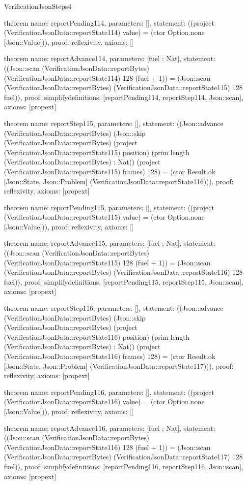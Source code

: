 \begin{lexlean}{VerificationJsonSteps4}
\begin{semanticmodule}
theorem{
  name: reportPending114,
  parameters: [],
  statement: ((project (VerificationJsonData::reportState114) value) = (ctor Option.none [Json::Value])),
  proof: reflexivity{},
  axioms: []
}

theorem{
  name: reportAdvance114,
  parameters: [fuel : Nat],
  statement: ((Json::scan (VerificationJsonData::reportBytes) (VerificationJsonData::reportState114) 128 (fuel + 1)) = (Json::scan (VerificationJsonData::reportBytes) (VerificationJsonData::reportState115) 128 fuel)),
  proof: simplify{definitions: [reportPending114, reportStep114, Json::scan]},
  axioms: [propext]
}

theorem{
  name: reportStep115,
  parameters: [],
  statement: ((Json::advance (VerificationJsonData::reportBytes) (Json::skip (VerificationJsonData::reportBytes) (project (VerificationJsonData::reportState115) position) (prim length (VerificationJsonData::reportBytes) : Nat)) (project (VerificationJsonData::reportState115) frames) 128) = (ctor Result.ok [Json::State, Json::Problem] (VerificationJsonData::reportState116))),
  proof: reflexivity{},
  axioms: [propext]
}

theorem{
  name: reportPending115,
  parameters: [],
  statement: ((project (VerificationJsonData::reportState115) value) = (ctor Option.none [Json::Value])),
  proof: reflexivity{},
  axioms: []
}

theorem{
  name: reportAdvance115,
  parameters: [fuel : Nat],
  statement: ((Json::scan (VerificationJsonData::reportBytes) (VerificationJsonData::reportState115) 128 (fuel + 1)) = (Json::scan (VerificationJsonData::reportBytes) (VerificationJsonData::reportState116) 128 fuel)),
  proof: simplify{definitions: [reportPending115, reportStep115, Json::scan]},
  axioms: [propext]
}

theorem{
  name: reportStep116,
  parameters: [],
  statement: ((Json::advance (VerificationJsonData::reportBytes) (Json::skip (VerificationJsonData::reportBytes) (project (VerificationJsonData::reportState116) position) (prim length (VerificationJsonData::reportBytes) : Nat)) (project (VerificationJsonData::reportState116) frames) 128) = (ctor Result.ok [Json::State, Json::Problem] (VerificationJsonData::reportState117))),
  proof: reflexivity{},
  axioms: [propext]
}

theorem{
  name: reportPending116,
  parameters: [],
  statement: ((project (VerificationJsonData::reportState116) value) = (ctor Option.none [Json::Value])),
  proof: reflexivity{},
  axioms: []
}

theorem{
  name: reportAdvance116,
  parameters: [fuel : Nat],
  statement: ((Json::scan (VerificationJsonData::reportBytes) (VerificationJsonData::reportState116) 128 (fuel + 1)) = (Json::scan (VerificationJsonData::reportBytes) (VerificationJsonData::reportState117) 128 fuel)),
  proof: simplify{definitions: [reportPending116, reportStep116, Json::scan]},
  axioms: [propext]
}


\end{semanticmodule}
\end{lexlean}
